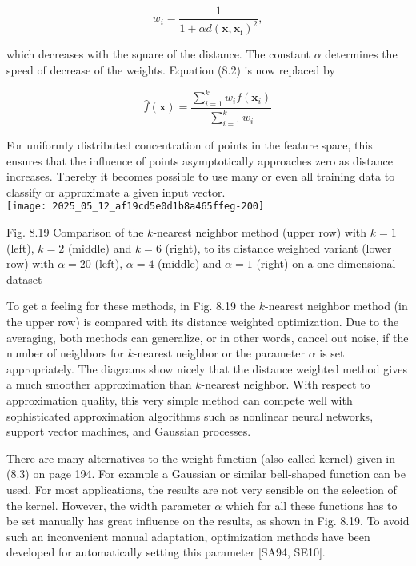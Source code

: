 \documentclass[10pt]{article}
\begin{document}
\begin{equation*}
w_{i}=\frac{1}{1+\alpha d\left(\boldsymbol{x}, \boldsymbol{x}_{\boldsymbol{i}}\right)^{2}}, \tag{8.3}
\end{equation*}


which decreases with the square of the distance. The constant $\alpha$ determines the speed of decrease of the weights. Equation (8.2) is now replaced by

$$
\hat{f}(\boldsymbol{x})=\frac{\sum_{i=1}^{k} w_{i} f\left(\boldsymbol{x}_{i}\right)}{\sum_{i=1}^{k} w_{i}}
$$

For uniformly distributed concentration of points in the feature space, this ensures that the influence of points asymptotically approaches zero as distance increases. Thereby it becomes possible to use many or even all training data to classify or approximate a given input vector.\\
\texttt{[image: 2025\_05\_12\_af19cd5e0d1b8a465ffeg-200]}

Fig. 8.19 Comparison of the $k$-nearest neighbor method (upper row) with $k=1$ (left), $k=2$ (middle) and $k=6$ (right), to its distance weighted variant (lower row) with $\alpha=20$ (left), $\alpha=4$ (middle) and $\alpha=1$ (right) on a one-dimensional dataset

To get a feeling for these methods, in Fig. 8.19 the $k$-nearest neighbor method (in the upper row) is compared with its distance weighted optimization. Due to the averaging, both methods can generalize, or in other words, cancel out noise, if the number of neighbors for $k$-nearest neighbor or the parameter $\alpha$ is set appropriately. The diagrams show nicely that the distance weighted method gives a much smoother approximation than $k$-nearest neighbor. With respect to approximation quality, this very simple method can compete well with sophisticated approximation algorithms such as nonlinear neural networks, support vector machines, and Gaussian processes.

There are many alternatives to the weight function (also called kernel) given in (8.3) on page 194. For example a Gaussian or similar bell-shaped function can be used. For most applications, the results are not very sensible on the selection of the kernel. However, the width parameter $\alpha$ which for all these functions has to be set manually has great influence on the results, as shown in Fig. 8.19. To avoid such an inconvenient manual adaptation, optimization methods have been developed for automatically setting this parameter [SA94, SE10].
\end{document}
